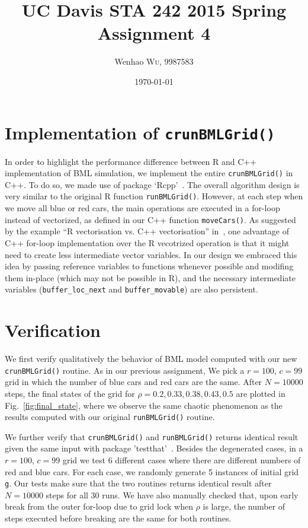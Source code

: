 \documentclass{article}
\title{UC Davis STA 242 2015 Spring Assignment 4} %
\author{Wenhao \textsc{Wu}, 9987583} %
\date{\today} %
\begin{document}
\maketitle %


\section{Implementation of \texttt{crunBMLGrid()}}
In order to highlight the performance difference between R and C++
implementation of BML simulation, we implement the entire \texttt{crunBMLGrid()}
in C++. To do so, we made use of package `Rcpp'~\cite{}. The overall algorithm
design is very similar to the original R function \texttt{runBMLGrid()}.
However, at each step when we move all blue or red cars, the main operations are
executed in a for-loop instead of vectorized, as defined in our C++ function
\texttt{moveCars()}. As suggested by the example ``R vectorisation vs. C++
vectorisation'' in~\cite{}, one advantage of C++ for-loop implementation over
the R vecotrized operation is that it might need to create less intermediate
vector variables. In our design we embraced this idea by passing reference
variables to functions whenever possible and modifing them in-place (which may
not be possible in R), and the necessary intermediate variables
(\texttt{buffer\_loc\_next} and \texttt{buffer\_movable}) are also persistent.

\section{Verification}
We first verify qualitatively the behavior of BML model computed with our new
\texttt{crunBMLGrid()} routine. As in our previous assignment, We pick a
$r=100$, $c=99$ grid in which the number of blue cars and red cars are the same. After $N =
10000$ steps, the final states of the grid for $\rho = 0.2, 0.33, 0.38, 0.43,
0.5$ are plotted in Fig.~\ref{fig:final_state}, where we observe the same
chaotic phenomenon as the results computed with our original
\texttt{runBMLGrid()} routine.

We further verify that \texttt{crunBMLGrid()} and \texttt{runBMLGrid()}
returns identical result given the same input with package 'testthat'~\cite{}.
Besides the degenerated cases, in a $r=100$, $c=99$ grid we test 6 different cases
where there are different numbers of red and blue cars. For each case, we
randomly generate 5 instances of initial grid \texttt{g}. Our tests make sure
that the two routines returns identical result after $N =
10000$ steps for all 30 runs. We have also manually checked that, upon early
break from the outer for-loop due to grid lock when $\rho$ is large, the number of steps
executed before breaking are the same for both routines.
\end{document}
